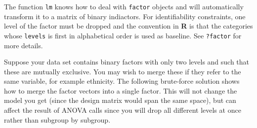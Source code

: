 \documentclass[]{book}
\newenvironment{Shaded}{\begin{snugshade}}{\end{snugshade}}
\newcommand{\CommentTok}[1]{\textcolor[rgb]{0.56,0.35,0.01}{\textit{#1}}}
\newcommand{\DataTypeTok}[1]{\textcolor[rgb]{0.13,0.29,0.53}{#1}}
\newcommand{\DecValTok}[1]{\textcolor[rgb]{0.00,0.00,0.81}{#1}}
\newcommand{\FloatTok}[1]{\textcolor[rgb]{0.00,0.00,0.81}{#1}}
\newcommand{\KeywordTok}[1]{\textcolor[rgb]{0.13,0.29,0.53}{\textbf{#1}}}
\newcommand{\NormalTok}[1]{#1}
\newcommand{\OperatorTok}[1]{\textcolor[rgb]{0.81,0.36,0.00}{\textbf{#1}}}
\newcommand{\StringTok}[1]{\textcolor[rgb]{0.31,0.60,0.02}{#1}}
\theoremstyle{definition}
\theoremstyle{definition}
\theoremstyle{definition}
\theoremstyle{remark}
\begin{document}
The function \texttt{lm} knows how to deal with \texttt{factor} objects
and will automatically transform it to a matrix of binary indiactors.
For identifiability constraints, one level of the factor must be dropped
and the convention in \textbf{R} is that the categories whose
\texttt{levels} is first in alphabetical order is used as baseline. See
\texttt{?factor} for more details.

Suppose your data set contains binary factors with only two levels and
such that these are mutually exclusive. You may wish to merge these if
they refer to the same variable, for example ethnicity. The following
brute-force solution shows how to merge the factor vectors into a single
factor. This will not change the model you get (since the design matrix
would span the same space), but can affect the result of ANOVA calls
since you will drop all different levels at once rather than subgroup by
subgroup.

\begin{Shaded}
\end{Shaded}
\end{document}
